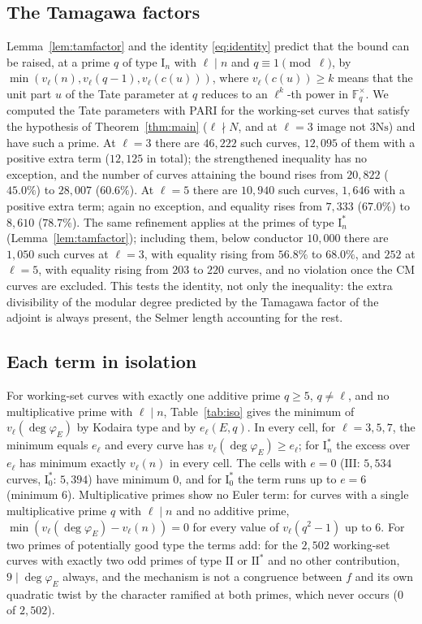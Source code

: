 \documentclass[11pt]{amsart}
\theoremstyle{definition}
\newcommand{\F}{\mathbb{F}}
\newcommand{\degphi}{\deg\varphi_E}
\newcommand{\Ns}{3\mathrm{Ns}}
\begin{document}
\subsection{The Tamagawa factors}\label{sec:tam}
Lemma~\ref{lem:tamfactor} and the identity \eqref{eq:identity} predict that the bound can be raised, at a prime $q$ of type $\mathrm{I}_n$ with $\ell\mid n$ and $q\equiv1\pmod\ell$, by $\min(v_\ell(n),v_\ell(q-1),v_\ell(c(u)))$, where $v_\ell(c(u))\ge k$ means that the unit part $u$ of the Tate parameter at $q$ reduces to an $\ell^k$-th power in $\F_q^\times$. We computed the Tate parameters with PARI for the working-set curves that satisfy the hypothesis of Theorem~\ref{thm:main} ($\ell\nmid N$, and at $\ell=3$ image not $\Ns$) and have such a prime. At $\ell=3$ there are $46{,}222$ such curves, $12{,}095$ of them with a positive extra term ($12{,}125$ in total); the strengthened inequality has no exception, and the number of curves attaining the bound rises from $20{,}822$ ($45.0\%$) to $28{,}007$ ($60.6\%$). At $\ell=5$ there are $10{,}940$ such curves, $1{,}646$ with a positive extra term; again no exception, and equality rises from $7{,}333$ ($67.0\%$) to $8{,}610$ ($78.7\%$). The same refinement applies at the primes of type $\mathrm{I}_n^*$ (Lemma~\ref{lem:tamfactor}); including them, below conductor $10{,}000$ there are $1{,}050$ such curves at $\ell=3$, with equality rising from $56.8\%$ to $68.0\%$, and $252$ at $\ell=5$, with equality rising from $203$ to $220$ curves, and no violation once the CM curves are excluded. This tests the identity, not only the inequality: the extra divisibility of the modular degree predicted by the Tamagawa factor of the adjoint is always present, the Selmer length accounting for the rest.

\subsection{Each term in isolation}\label{sec:iso}
For working-set curves with exactly one additive prime $q\ge5$, $q\ne\ell$, and no multiplicative prime with $\ell\mid n$, Table~\ref{tab:iso} gives the minimum of $v_\ell(\degphi)$ by Kodaira type and by $e_\ell(E,q)$. In every cell, for $\ell=3,5,7$, the minimum equals $e_\ell$ and every curve has $v_\ell(\degphi)\ge e_\ell$; for $\mathrm{I}_n^*$ the excess over $e_\ell$ has minimum exactly $v_\ell(n)$ in every cell. The cells with $e=0$ ($\mathrm{III}$: $5{,}534$ curves, $\mathrm{I}_0^*$: $5{,}394$) have minimum $0$, and for $\mathrm{I}_0^*$ the term runs up to $e=6$ (minimum $6$). Multiplicative primes show no Euler term: for curves with a single multiplicative prime $q$ with $\ell\mid n$ and no additive prime, $\min(v_\ell(\degphi)-v_\ell(n))=0$ for every value of $v_\ell(q^2-1)$ up to $6$. For two primes of potentially good type the terms add: for the $2{,}502$ working-set curves with exactly two odd primes of type $\mathrm{II}$ or $\mathrm{II}^*$ and no other contribution, $9\mid\degphi$ always, and the mechanism is not a congruence between $f$ and its own quadratic twist by the character ramified at both primes, which never occurs ($0$ of $2{,}502$).
\end{document}
